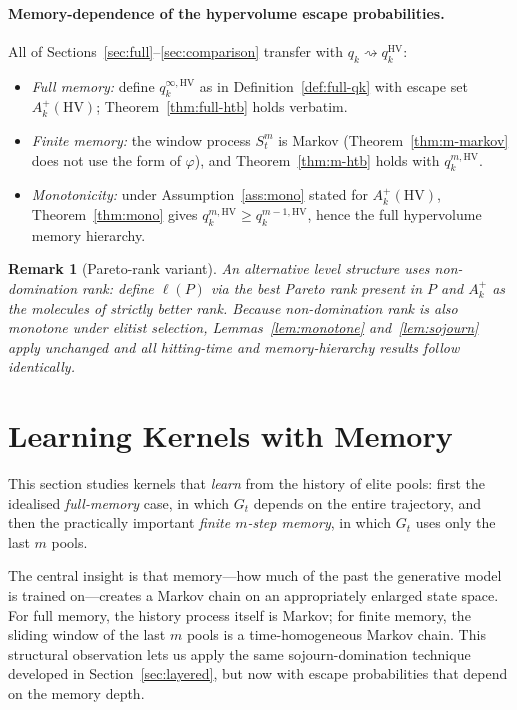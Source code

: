 \documentclass[11pt,a4paper]{article}
\newtheorem{remark}[theorem]{Remark}
\newcommand{\Akp}{A_k^{+}}
\begin{document}
\paragraph{Memory-dependence of the hypervolume escape probabilities.}

All of Sections~\ref{sec:full}--\ref{sec:comparison} transfer with
$q_k\rightsquigarrow q_k^{\mathrm{HV}}$:

\begin{itemize}[nosep]
\item \emph{Full memory:} define $q_k^{\infty,\mathrm{HV}}$ as in
  Definition~\ref{def:full-qk} with escape set $\Akp(\mathrm{HV})$;
  Theorem~\ref{thm:full-htb} holds verbatim.
\item \emph{Finite memory:} the window process $S_t^m$ is Markov
  (Theorem~\ref{thm:m-markov} does not use the form of $\varphi$), and
  Theorem~\ref{thm:m-htb} holds with $q_k^{m,\mathrm{HV}}$.
\item \emph{Monotonicity:} under Assumption~\ref{ass:mono} stated for
  $\Akp(\mathrm{HV})$, Theorem~\ref{thm:mono} gives
  $q_k^{m,\mathrm{HV}}\ge q_k^{m-1,\mathrm{HV}}$, hence the full
  hypervolume memory hierarchy.
\end{itemize}

\begin{remark}[Pareto-rank variant]
  An alternative level structure uses non-domination rank: define
  $\ell(P)$ via the best Pareto rank present in $P$ and $\Akp$ as the
  molecules of strictly better rank.  Because non-domination rank is
  also monotone under elitist selection, Lemmas~\ref{lem:monotone}
  and~\ref{lem:sojourn} apply unchanged and all hitting-time and
  memory-hierarchy results follow identically.
\end{remark}

\section{Learning Kernels with Memory}
\label{sec:finite}

This section studies kernels that \emph{learn} from the history of elite
pools: first the idealised \emph{full-memory} case, in which $G_t$ depends
on the entire trajectory, and then the practically important \emph{finite
$m$-step memory}, in which $G_t$ uses only the last $m$ pools.

The central insight is that memory---how much of the past the generative
model is trained on---creates a Markov chain on an appropriately enlarged
state space.  For full memory, the history process itself is Markov; for
finite memory, the sliding window of the last $m$ pools is a
time-homogeneous Markov chain.  This structural observation lets us apply
the same sojourn-domination technique developed in Section~\ref{sec:layered},
but now with escape probabilities that depend on the memory depth.
\end{document}
